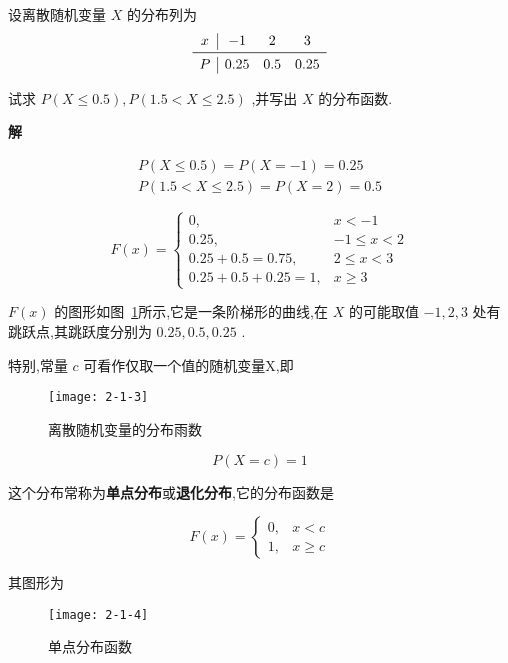 \begin{example}\label{exam:2.1.4}
	设离散随机变量 $ X $ 的分布列为
	\[ 
	\begin{array}{c|ccc}
	x & -1 & 2 & 3 \\\midrule
	P & 0.25 & 0.5 & 0.25 \\
	\end{array}
	\]
	
	试求 $ P(X \leqslant 0.5), P(1.5<X \leqslant 2.5) $ ,并写出 $ X $ 的分布函数.
	
	\textbf{解}
	
	\[ 
	\begin{array}{l}{P(X \leqslant 0.5)=P(X=-1)=0.25} \\ {P(1.5<X \leqslant 2.5)=P(X=2)=0.5}\end{array}
	\]
	
	\[ 
	F(x)=\left\{\begin{array}{ll}
	{0,} & {x<-1} \\ 
	{0.25,} & {-1 \leqslant x<2} \\ 
	{0.25+0.5=0.75,} & {2 \leqslant x<3} \\ 
	{0.25+0.5+0.25=1,} & {x \geqslant 3}
	\end{array}\right.\]
	
	 $ F(x) $ 的图形如图~\ref{fig:2.1.3}所示,它是一条阶梯形的曲线,在 $ X $ 的可能取值 $ -1,2,3 $ 处有跳跃点,其跳跃度分别为 $ 0.25,0.5,0.25 $ .
	
	
	特别,常量 $ c $ 可看作仅取一个值的随机变量X,即
	
	\begin{figure}
		\centering
		\texttt{[image: 2-1-3]}
		\caption{离散随机变量的分布雨数}
		\label{fig:2.1.3}
	\end{figure}
	
	\[ 
	P(X=c)=1
	\]
	
	这个分布常称为\textbf{单点分布}或\textbf{退化分布},它的分布函数是
	
	\begin{equation}
	F(x)=\left\{\begin{array}{ll}
	{0,} & {x<c} \\ 
	{1,} & {x \geqslant c}
	\end{array}\right.  \label{eq:2.1.3}
	\end{equation}
	
	其图形为
	
	\begin{figure}
		\centering
		\texttt{[image: 2-1-4]}
		\caption{单点分布函数}
		\label{fig:2.1.4}
	\end{figure}

\end{example}

